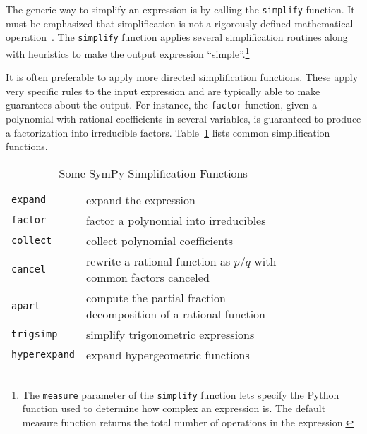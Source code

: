 



The generic way to simplify an expression is by calling the \texttt{simplify}
function.
It must be emphasized that simplification is not a rigorously defined
mathematical operation~\cite{Carette2004understanding}.
The \texttt{simplify} function applies several simplification routines along
with heuristics to make the output expression ``simple''.\footnote{The
\texttt{measure} parameter of the \texttt{simplify}
function lets specify the Python function used to determine how complex an
expression is.  The default measure function returns the total number of
operations in the expression.}

It is often preferable to apply more directed simplification functions. These
apply very specific rules to the input expression and are typically able to make
guarantees about the output. For instance, the \texttt{factor} function,
given a polynomial with rational coefficients in several variables,
is guaranteed to
produce a factorization into irreducible factors. Table~\ref{simplify-table}
lists common simplification functions.

\begin{longtable}[htbc]{lp{0.83\linewidth}}
\caption{Some SymPy Simplification Functions\label{simplify-table}}\\
\toprule
\verb|expand| & expand the expression \\
\verb|factor| & factor a polynomial into irreducibles \\
\verb|collect| & collect polynomial coefficients \\
\verb|cancel| & rewrite a rational function as $p/q$ with common factors
canceled \\
\verb|apart| & compute the partial fraction decomposition of a rational function
\\
\verb|trigsimp| & simplify trigonometric expressions~\cite{fu2006automated} \\
\verb|hyperexpand| & expand hypergeometric functions~\cite{Roach1996hyper,roach1997meijerg} \\
\bottomrule
\end{longtable}
